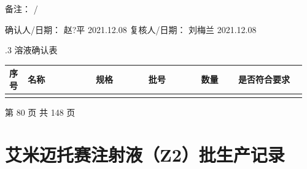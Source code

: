 \documentclass[UTF8,10pt,a4paper,fontset=fandol]{ctexart}
\newcommand{\fieldvalue}[1]{#1}
\newcommand{\handwritten}[1]{#1}
\begin{document}
\noindent 备注：
\handwritten{/}

\noindent
确认人/日期：
\fieldvalue{\handwritten{赵?平 2021.12.08}}
\hfill
复核人/日期：
\fieldvalue{\handwritten{刘梅兰 2021.12.08}}

\vspace{0.5em}
.3 溶液确认表

\begin{center}
\small
\begin{tabular}{|p{0.06\linewidth}|p{0.22\linewidth}|p{0.17\linewidth}|p{0.17\linewidth}|p{0.12\linewidth}|p{0.22\linewidth}|}
\hline
序号 & 名称 & 规格 & 批号 & 数量 & 是否符合要求\\
\hline
 & & & & & \\
\hline
\end{tabular}
\end{center}

\begin{center}
第 80 页 共 148 页
\end{center}

\newpage

\section*{艾米迈托赛注射液（Z2）批生产记录}
\end{document}
